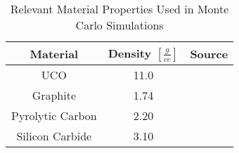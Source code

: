 \begin{table}[h!]
\centering
\caption{Relevant Material Properties Used in Monte Carlo Simulations}
\begin{tabular}{ c  c  c }
\hline
Material & Density $[\frac{g}{cc}]$ & Source \\
\hline
UCO & 11.0 & \cite{helmreich_year_2017, phillips_fabrication_2012}  \\
Graphite & 1.74 & \cite{ho_graphite_1988, johnson_properties_1976} \\
Pyrolytic Carbon & 2.20 & \cite{nea_nea_2018} \\
Silicon Carbide & 3.10 & \cite{nea_nea_2018} \\
\hline
\end{tabular}

\label{table:mat-params}
\end{table}